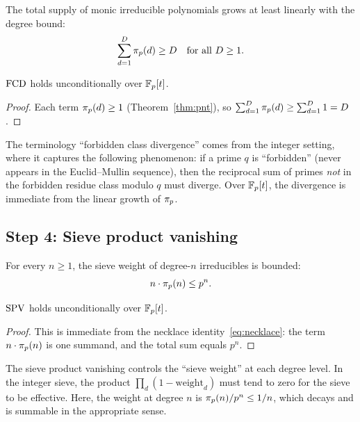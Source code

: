 \begin{definition}
The total supply of monic irreducible polynomials grows at least linearly
with the degree bound:
\[
  \sum_{d=1}^{D} \pi_p(d) \geq D \quad \text{for all } D \geq 1.
\]
\end{definition}

\begin{theorem}\label{thm:fcd}
$\mathrm{FCD}$ holds unconditionally over $\mathbb{F}_p[t]$.
\end{theorem}

\begin{proof}
Each term $\pi_p(d) \geq 1$ (Theorem~\ref{thm:pnt}), so
$\sum_{d=1}^{D} \pi_p(d) \geq \sum_{d=1}^{D} 1 = D$.
\end{proof}

The terminology ``forbidden class divergence'' comes from the integer setting,
where it captures the following phenomenon: if a prime $q$ is ``forbidden''
(never appears in the Euclid--Mullin sequence), then the reciprocal sum of
primes \emph{not} in the forbidden residue class modulo $q$ must diverge.
Over $\mathbb{F}_p[t]$, the divergence is immediate from the linear growth of
$\pi_p$.


\subsection{Step 4: Sieve product vanishing}

\begin{definition}
For every $n \geq 1$, the sieve weight of degree-$n$ irreducibles is bounded:
\[
  n \cdot \pi_p(n) \leq p^n.
\]
\end{definition}

\begin{theorem}\label{thm:spv}
$\mathrm{SPV}$ holds unconditionally over $\mathbb{F}_p[t]$.
\end{theorem}

\begin{proof}
This is immediate from the necklace identity~\eqref{eq:necklace}: the term
$n \cdot \pi_p(n)$ is one summand, and the total sum equals $p^n$.
\end{proof}

The sieve product vanishing controls the ``sieve weight'' at each degree
level. In the integer sieve, the product $\prod_d (1 - \text{weight}_d)$
must tend to zero for the sieve to be effective. Here, the weight at
degree $n$ is $\pi_p(n) / p^n \leq 1/n$, which decays and is
summable in the appropriate sense.

